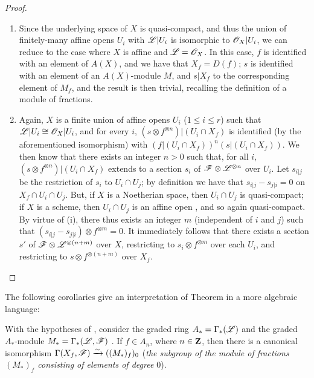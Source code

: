 \begin{proof}
\label{proof-1.9.3.1}
\medskip\noindent
\begin{enumerate}[label=(\roman*)]
  \item Since the underlying space of $X$ is quasi-compact, and thus the union of
    finitely-many affine opens $U_i$ with $\mathscr{L}|U_i$ is isomorphic to
    $\mathscr{O}_X|U_i$, we can reduce to the case where $X$ is affine and $\mathscr{L}=\mathscr{O}_X$.
    In this case, $f$ is identified with an element of $A(X)$, and we have that
    $X_f=D(f)$; $s$ is identified with an element of an $A(X)$-module $M$, and
    $s|X_f$ to the corresponding element of $M_f$, and the result is then trivial,
    recalling the definition of a module of fractions.
  \item Again, $X$ is a finite union of affine opens $U_i$ ($1\leqslant i\leqslant r$)
    such that $\mathscr{L}|U_i\cong\mathscr{O}_X|U_i$, and for every $i$,
    $(s\otimes f^{\otimes n})|(U_i\cap X_f)$ is identified (by the aforementioned
    isomorphism) with $(f|(U_i\cap X_f))^n(s|(U_i\cap X_f))$. We then know
     that there exists an integer $n>0$ such that, for all
    $i$, $(s\otimes f^{\otimes n})|(U_i\cap X_f)$ extends to a section $s_i$ of
    $\mathscr{F}\otimes\mathscr{L}^{\otimes n}$ over $U_i$. Let $s_{i|j}$ be the restriction
    of $s_i$ to $U_i\cap U_j$; by definition we have that $s_{i|j}-s_{j|i}=0$ on
    $X_f\cap U_i\cap U_j$. But, if $X$ is a Noetherian space, then $U_i\cap U_j$ is
    quasi-compact; if $X$ is a scheme, then $U_i\cap U_j$ is an affine open
    , and so again quasi-compact. By virtue of (i), there thus
    exists an integer $m$ (independent of $i$ and $j$) such that
    $(s_{i|j}-s_{j|i})\otimes f^{\otimes m}=0$. It immediately follows that there
    exists a section $s'$ of $\mathscr{F}\otimes\mathscr{L}^{\otimes(n+m)}$ over $X$,
    restricting to $s_i\otimes f^{\otimes m}$ over each $U_i$, and restricting to
    $s\otimes f^{\otimes(n+m)}$ over $X_f$.
\end{enumerate}
\end{proof}

The following corollaries give an interpretation of Theorem  in a more
algebraic language:
\begin{cor}[9.3.2]
\label{1.9.3.2}
With the hypotheses of , consider the graded ring $A_*=\Gamma_*(\mathscr{L})$
and the graded $A_*$-module $M_*=\Gamma_*(\mathscr{L},\mathscr{F})$ . If $f\in A_n$,
where $n\in\mathbf{Z}$, then there is a canonical isomorphism
$\Gamma(X_f,\mathscr{F})\xrightarrow{\sim}((M_*)_f)_0$ (\emph{the subgroup of the module of
fractions $(M_*)_f$ consisting of elements of degree $0$}).
\end{cor}

